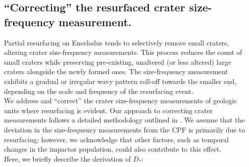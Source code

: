 \documentclass[preprint,12pt,3p,times,authoryear]{elsarticle}
\begin{document}
\subsection{``Correcting'' the resurfaced crater size-frequency measurement.}
\label{app:correction}
Partial resurfacing on Enceladus tends to selectively remove small craters, altering crater size-frequency measurements. This process reduces the count of small craters while preserving pre-existing, unaltered (or less altered) large craters alongside the newly formed ones. The size-frequency measurement exhibits a gradual or irregular wavy pattern roll-off towards the smaller end, depending on the scale and frequency of the resurfacing event.\\

We address and ``correct'' the crater size-frequency measurements of geologic units where resurfacing is evident.
Our approach to correcting crater measurements follows a detailed methodology outlined in \citet{Michael2010}. We assume that the deviation in the size-frequency measurements from the CPF is primarily due to resurfacing; however, we acknowledge that other factors, such as temporal changes in the impactor population, could also contribute to this effect.\\

Here, we briefly describe the derivation of $D_*$:%
\end{document}
